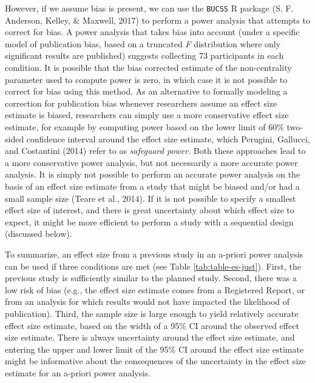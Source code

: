 \documentclass[
  english,
  ,jou,floatsintext]{apa6}
\begin{document}
However, if we assume bias is present, we can use the \texttt{BUCSS} R package (S. F. Anderson, Kelley, \& Maxwell, 2017) to perform a power analysis that attempts to correct for bias. A power analysis that takes bias into account (under a specific model of publication bias, based on a truncated \emph{F} distribution where only significant results are published) suggests collecting 73 participants in each condition. It is possible that the bias corrected estimate of the non-centrality parameter used to compute power is zero, in which case it is not possible to correct for bias using this method. As an alternative to formally modeling a correction for publication bias whenever researchers assume an effect size estimate is biased, researchers can simply use a more conservative effect size estimate, for example by computing power based on the lower limit of 60\% two-sided confidence interval around the effect size estimate, which Perugini, Gallucci, and Costantini (2014) refer to as \emph{safeguard power}. Both these approaches lead to a more conservative power analysis, but not necessarily a more accurate power analysis. It is simply not possible to perform an accurate power analysis on the basis of an effect size estimate from a study that might be biased and/or had a small sample size (Teare et al., 2014). If it is not possible to specify a smallest effect size of interest, and there is great uncertainty about which effect size to expect, it might be more efficient to perform a study with a sequential design (discussed below).

To summarize, an effect size from a previous study in an a-priori power analysis can be used if three conditions are met (see Table \ref{tab:table-es-just}). First, the previous study is sufficiently similar to the planned study. Second, there was a low risk of bias (e.g., the effect size estimate comes from a Registered Report, or from an analysis for which results would not have impacted the likelihood of publication). Third, the sample size is large enough to yield relatively accurate effect size estimate, based on the width of a 95\% CI around the observed effect size estimate. There is always uncertainty around the effect size estimate, and entering the upper and lower limit of the 95\% CI around the effect size estimate might be informative about the consequences of the uncertainty in the effect size estimate for an a-priori power analysis.
\end{document}
